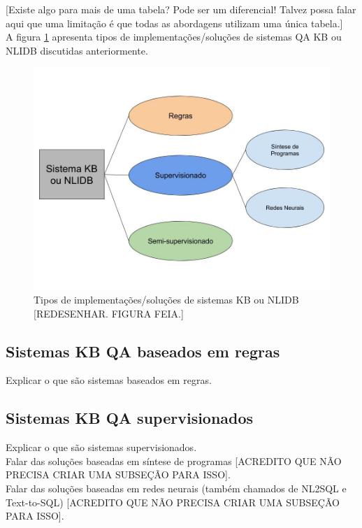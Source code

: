 \documentclass{article}
\begin{document}
[Existe algo para mais de uma tabela? Pode ser um diferencial! Talvez possa falar aqui que uma limitação é que todas as abordagens utilizam uma única tabela.]\\

A figura \ref{fig:SistemaKBNLIDB} apresenta tipos de implementações/soluções de sistemas QA KB ou NLIDB discutidas anteriormente.

\begin{figure}[h!]
\centering
\includegraphics[scale=0.3]{SistemaKBNLIDB.jpg}
\caption{Tipos de implementações/soluções de sistemas KB ou NLIDB [REDESENHAR. FIGURA FEIA.]}
\label{fig:SistemaKBNLIDB}
\end{figure}

\subsection{Sistemas KB QA baseados em regras}

Explicar o que são sistemas baseados em regras.

\subsection{Sistemas KB QA supervisionados}

Explicar o que são sistemas supervisionados.\\

Falar das soluções baseadas em síntese de programas [ACREDITO QUE NÃO PRECISA CRIAR UMA SUBSEÇÃO PARA ISSO].\\

Falar das soluções baseadas em redes neurais (também chamados de NL2SQL e Text-to-SQL) [ACREDITO QUE NÃO PRECISA CRIAR UMA SUBSEÇÃO PARA ISSO].\\
\end{document}
